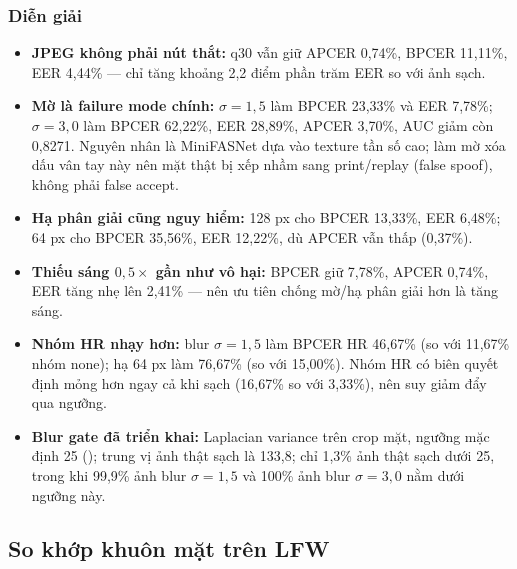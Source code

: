 \documentclass[12pt,a4paper]{article}
\begin{document}
\subsubsection{Diễn giải}
\begin{itemize}
  \item \textbf{JPEG không phải nút thắt:} q30 vẫn giữ APCER 0,74\%, BPCER 11,11\%, EER 4,44\% ---
        chỉ tăng khoảng 2,2 điểm phần trăm EER so với ảnh sạch.
  \item \textbf{Mờ là failure mode chính:} $\sigma=1{,}5$ làm BPCER 23,33\% và EER 7,78\%;
        $\sigma=3{,}0$ làm BPCER 62,22\%, EER 28,89\%, APCER 3,70\%, AUC giảm còn 0,8271.
        Nguyên nhân là MiniFASNet dựa vào texture tần số cao; làm mờ xóa dấu vân tay này nên mặt thật
        bị xếp nhầm sang print/replay (false spoof), không phải false accept.
  \item \textbf{Hạ phân giải cũng nguy hiểm:} 128 px cho BPCER 13,33\%, EER 6,48\%; 64 px cho BPCER
        35,56\%, EER 12,22\%, dù APCER vẫn thấp (0,37\%).
  \item \textbf{Thiếu sáng $0{,}5\times$ gần như vô hại:} BPCER giữ 7,78\%, APCER 0,74\%, EER tăng nhẹ
        lên 2,41\% --- nên ưu tiên chống mờ/hạ phân giải hơn là tăng sáng.
  \item \textbf{Nhóm HR nhạy hơn:} blur $\sigma=1{,}5$ làm BPCER HR 46,67\% (so với 11,67\% nhóm
        none); hạ 64 px làm 76,67\% (so với 15,00\%). Nhóm HR có biên quyết định mỏng hơn ngay cả khi
        sạch (16,67\% so với 3,33\%), nên suy giảm đẩy qua ngưỡng.
  \item \textbf{Blur gate đã triển khai:} Laplacian variance trên crop mặt, ngưỡng mặc định 25
        (); trung vị ảnh thật sạch là 133,8; chỉ 1,3\% ảnh thật sạch dưới 25,
        trong khi 99,9\% ảnh blur $\sigma=1{,}5$ và 100\% ảnh blur $\sigma=3{,}0$ nằm dưới ngưỡng này.
\end{itemize}

\subsection{So khớp khuôn mặt trên LFW}
\end{document}
